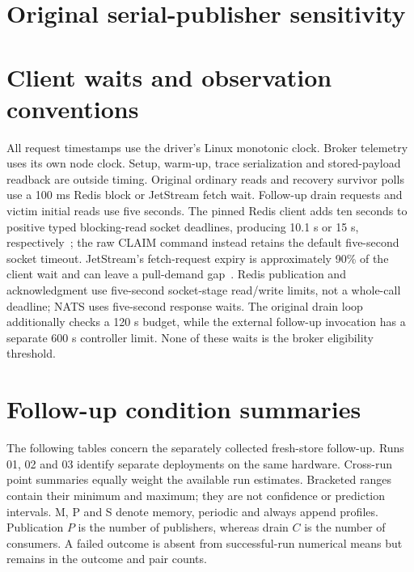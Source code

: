\documentclass[11pt]{article}
\theoremstyle{definition}
\begin{document}
\section{Original serial-publisher sensitivity}\label{app:serial}
\begin{table}[htbp]\centering\small

\caption{Original fixed-count, one-publisher sensitivity.}
\end{table}
\FloatBarrier

\section{Client waits and observation conventions}\label{sec:client-waits}
All request timestamps use the driver's Linux monotonic clock. Broker telemetry uses its own node clock. Setup, warm-up, trace serialization and stored-payload readback are outside timing. Original ordinary reads and recovery survivor polls use a 100 ms Redis block or JetStream fetch wait. Follow-up drain requests and victim initial reads use five seconds. The pinned Redis client adds ten seconds to positive typed blocking-read socket deadlines, producing 10.1 s or 15 s, respectively~\cite{goredis970timeouts}; the raw CLAIM command instead retains the default five-second socket timeout. JetStream's fetch-request expiry is approximately 90\% of the client wait and can leave a pull-demand gap~\cite{natsgo1391}. Redis publication and acknowledgment use five-second socket-stage read/write limits, not a whole-call deadline; NATS uses five-second response waits. The original drain loop additionally checks a 120 s budget, while the external follow-up invocation has a separate 600 s controller limit. None of these waits is the broker eligibility threshold.

\section{Follow-up condition summaries}
The following tables concern the separately collected fresh-store follow-up. Runs 01, 02 and 03 identify separate deployments on the same hardware. Cross-run point summaries equally weight the available run estimates. Bracketed ranges contain their minimum and maximum; they are not confidence or prediction intervals. M, P and S denote memory, periodic and always append profiles. Publication $P$ is the number of publishers, whereas drain $C$ is the number of consumers. A failed outcome is absent from successful-run numerical means but remains in the outcome and pair counts.
\end{document}
